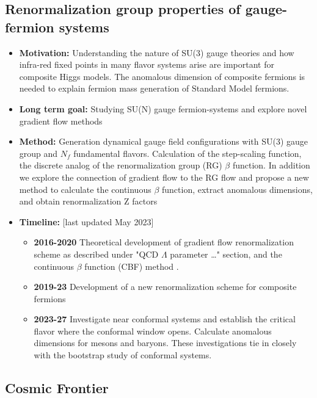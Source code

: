 \documentclass[12pt,hyperpdf]{article}
\begin{document}
\subsection{Renormalization group properties of gauge-fermion systems }
\begin{itemize}
    \item { \bf Motivation:}
     Understanding the nature of SU(3) gauge theories and how infra-red
     fixed points in many flavor systems arise are important for composite Higgs models. The anomalous dimension of composite fermions is needed to explain fermion mass generation of Standard Model fermions.  
    \item {\bf Long term goal:} Studying SU(N) gauge fermion-systems and explore novel gradient flow methods
    \item {\bf Method:}  Generation dynamical gauge field configurations with
     SU(3) gauge group and $N_f$ fundamental flavors. Calculation of
     the step-scaling function, the discrete analog of the
     renormalization group (RG) $\beta$ function. In addition we
     explore the connection of gradient flow to the RG flow and propose
     a new method to calculate the continuous $\beta$ function,
     extract anomalous dimensions, and obtain renormalization Z factors
\item{\bf Timeline:} \hfill [last updated May 2023]
\begin{itemize}
    \item{\bf 2016-2020} Theoretical development of gradient flow renormalization scheme as described under "QCD $\Lambda$ parameter \dots " section, and  the continuous $\beta$ function (CBF) method \cite{Fodor:2017die,Hasenfratz:2019hpg}.
    \item{\bf 2019-23} Development of a new renormalization scheme for composite fermions \cite{Hasenfratz:2022wll}
    \item{\bf 2023-27} Investigate near conformal systems and establish the critical flavor where the conformal window opens. Calculate anomalous dimensions for mesons and baryons. These investigations tie in closely with the bootstrap study of conformal systems. 
\end{itemize}
\end{itemize}




\subsection{Cosmic Frontier}
\end{document}
